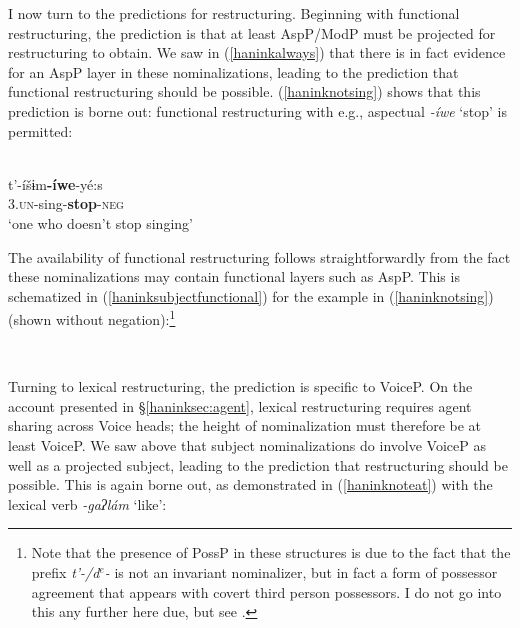 \documentclass[output=paper]{langscibook}
\begin{document}
I now turn to the predictions for restructuring. Beginning with functional restructuring, the prediction is that at least AspP/ModP must be projected for restructuring to obtain. We saw in (\ref{haninkalways}) that there is in fact evidence for an AspP layer in these nominalizations, leading to the prediction that functional restructuring should be possible. (\ref{haninknotsing}) shows that this prediction is borne out: functional restructuring with e.g., aspectual {\itshape -íwe} `stop' is permitted:


\\
{\gll t'-íšɨm\textbf{-íwe}-yé:s\\
{\scshape 3.un}-sing-\textbf{stop}-{\scshape neg}\\
\glt `one who doesn't stop singing'} \label{haninknotsing}
\z

The availability of functional restructuring follows straightforwardly from the fact these nominalizations may contain functional layers such as AspP. This is schematized in (\ref{haninksubjectfunctional}) for the example in 
(\ref{haninknotsing}) (shown without negation):\footnote{Note that the presence of PossP in these structures is due to the fact that the prefix {\itshape t'-/d$^e$-} is not an invariant nominalizer, but in fact a form of possessor agreement that appears with covert third person possessors. I do not go into this any further here due, but see \cite{hanink2020}.}

\ea \label{haninksubjectfunctional}\

\vspace{-1em}\hspace{-3em}
 \z 
 

\vspace{-1em}
Turning to lexical restructuring, the prediction is specific to VoiceP. On the account presented in \S\ref{haninksec:agent}, lexical restructuring requires agent sharing across Voice heads; the height of nominalization must therefore be at least VoiceP. We saw above that subject nominalizations do involve VoiceP as well as a projected subject, leading to the prediction that restructuring should be possible. This is again borne out, as demonstrated in (\ref{haninknoteat}) with the lexical verb {\itshape -gaʔlám} `like': 
\end{document}
